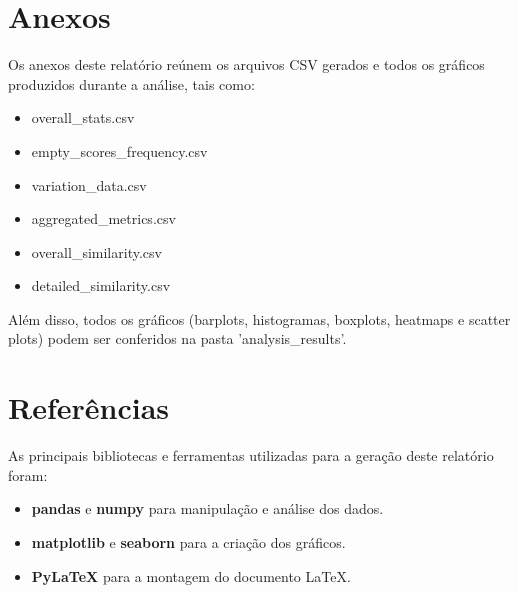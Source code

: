 \documentclass{article}%
\begin{document}
%
\section*{Anexos}%
\label{sec:Anexos}%
Os anexos deste relatório reúnem os arquivos CSV gerados e todos os gráficos produzidos durante a análise, tais como:%
\begin{itemize}%
\item overall\_stats.csv%
\item empty\_scores\_frequency.csv%
\item variation\_data.csv%
\item aggregated\_metrics.csv%
\item overall\_similarity.csv%
\item detailed\_similarity.csv%
\end{itemize}%
Além disso, todos os gráficos (barplots, histogramas, boxplots, heatmaps e scatter plots) podem ser conferidos na pasta 'analysis\_results'.

%
\section*{Referências}%
\label{sec:Referncias}%
As principais bibliotecas e ferramentas utilizadas para a geração deste relatório foram:%
\begin{itemize}%
\item \textbf{pandas} e \textbf{numpy} para manipulação e análise dos dados.%
\item \textbf{matplotlib} e \textbf{seaborn} para a criação dos gráficos.%
\item \textbf{PyLaTeX} para a montagem do documento LaTeX.%
\end{itemize}

%
\end{document}
